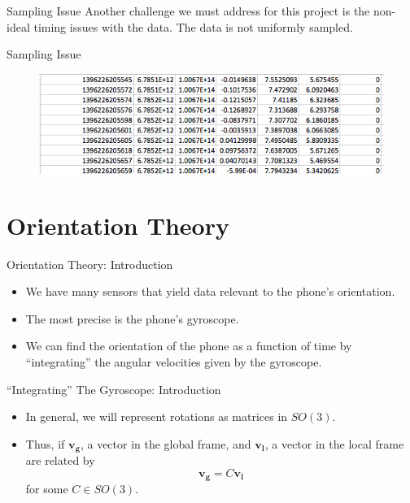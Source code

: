 \documentclass[10pt]{beamer}
\begin{document}
\begin{frame} {Sampling Issue}
Another challenge we must address for this project is the non-ideal timing issues with the data. The data is not uniformly sampled. 
\end{frame}

\begin{frame} {Sampling Issue}
\begin{figure}
\includegraphics[scale=0.55]{images/data1.png}
\end{figure}
\end{frame}

\section{Orientation Theory}

\begin{frame}{Orientation Theory: Introduction}
  \begin{itemize}
  \item We have many sensors that yield data relevant to the phone's orientation.
  \item The most precise is the phone's gyroscope.
  \item We can find the orientation of the phone as a function of time by ``integrating'' the angular velocities given by the gyroscope.
  \end{itemize}
\end{frame}

\begin{frame}{``Integrating'' The Gyroscope: Introduction}
  \begin{itemize}
  \item In general, we will represent rotations as matrices in \(SO(3)\).
  \item Thus, if \(\bm{v_g}\), a vector in the global frame, and \(\bm{v_l}\), a vector in the local frame are related by
    \[\bm{v_g} = C\bm{v_l}\]
    for some \(C \in SO(3)\).
  \end{itemize}
\end{frame}
\end{document}
